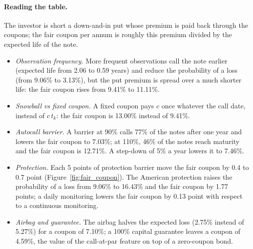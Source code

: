 \documentclass[11pt,a4paper]{article}
\begin{document}
\paragraph{Reading the table.} The investor is short a down-and-in put whose premium is paid back through the
coupons; the fair coupon per annum is roughly this premium divided by the expected life of the note.
\begin{itemize}
\item \emph{Observation frequency.} More frequent observations call the note earlier (expected life from 2.06 to
0.59 years) and reduce the probability of a loss (from 9.06\% to 3.13\%), but the put premium is spread over a much
shorter life: the fair coupon rises from 9.41\% to 11.11\%.
\item \emph{Snowball vs fixed coupon.} A fixed coupon pays $c$ once whatever the call date, instead of $c\,t_k$:
the fair coupon is 13.00\% instead of 9.41\%.
\item \emph{Autocall barrier.} A barrier at 90\% calls 77\% of the notes after one year and lowers the fair coupon
to 7.03\%; at 110\%, 46\% of the notes reach maturity and the fair coupon is 12.71\%. A step-down of 5\% a year
lowers it to 7.46\%.
\item \emph{Protection.} Each 5 points of protection barrier move the fair coupon by 0.4 to 0.7 point
(Figure~\ref{fig:fair_coupon}). The American protection raises the probability of a loss from 9.06\% to 16.43\% and
the fair coupon by 1.77 points; a daily monitoring lowers the fair coupon by 0.13 point with respect to a continuous
monitoring.
\item \emph{Airbag and guarantee.} The airbag halves the expected loss (2.75\% instead of 5.27\%) for a coupon of
7.10\%; a 100\% capital guarantee leaves a coupon of 4.59\%, the value of the call-at-par feature on top of a
zero-coupon bond.
\end{itemize}
\end{document}
